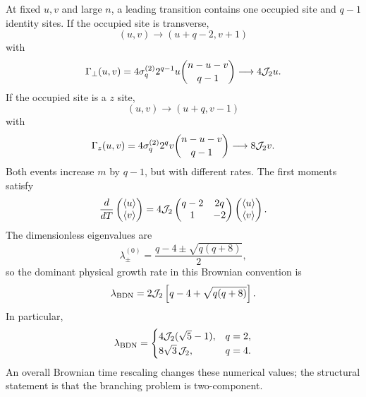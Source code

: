 \documentclass{article}
\theoremstyle{definition}
\begin{document}
At fixed $u,v$ and large $n$, a leading transition contains one occupied
site and $q-1$ identity sites.  If the occupied site is transverse,
\begin{equation}
    (u,v)\longrightarrow(u+q-2,v+1)
\end{equation}
with
\begin{equation}
    \Gamma_\perp(u,v)
    =4\sigma_q^{(2)}2^{q-1}u
      \binom{n-u-v}{q-1}
    \longrightarrow4{\cal J}_2u.
\end{equation}
If the occupied site is a $z$ site,
\begin{equation}
    (u,v)\longrightarrow(u+q,v-1)
\end{equation}
with
\begin{equation}
    \Gamma_z(u,v)
    =4\sigma_q^{(2)}2^qv
      \binom{n-u-v}{q-1}
    \longrightarrow8{\cal J}_2v.
\end{equation}
Both events increase $m$ by $q-1$, but with different rates.  The first
moments satisfy
\begin{equation}
    \frac{d}{dT}
    \begin{pmatrix}\langle u\rangle\\\langle v\rangle\end{pmatrix}
    =4{\cal J}_2
    \begin{pmatrix}
       q-2&2q\\
       1&-2
    \end{pmatrix}
    \begin{pmatrix}\langle u\rangle\\\langle v\rangle\end{pmatrix}.
\end{equation}
The dimensionless eigenvalues are
\begin{equation}
    \lambda_\pm^{(0)}
    =\frac{q-4\pm\sqrt{q(q+8)}}{2},
\end{equation}
so the dominant physical growth rate in this Brownian convention is
\begin{equation}
    \lambda_{\rm BDN}
    =2{\cal J}_2\left[q-4+\sqrt{q(q+8)}\right].
\end{equation}
In particular,
\begin{equation}
    \lambda_{\rm BDN}
    =\begin{cases}
       4{\cal J}_2(\sqrt5-1),&q=2,\\
       8\sqrt3\,{\cal J}_2,&q=4.
    \end{cases}
\end{equation}
An overall Brownian time rescaling changes these numerical values; the
structural statement is that the branching problem is two-component.
\end{document}
